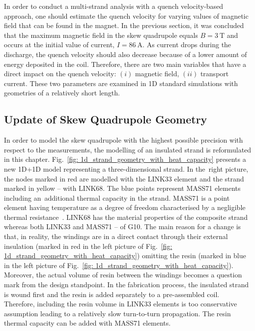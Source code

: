 
In order to conduct a multi-strand analysis with a quench velocity-based approach, one should estimate the quench velocity for varying values of magnetic field that can be found in the magnet. In the previous section, it was concluded that the maximum magnetic field in the skew quadrupole equals $B=3~\text{T}$ and occurs at the initial value of current, $I=86~\text{A}$. As current drops during the discharge, the quench velocity should also decrease because of a lower amount of energy deposited in the coil. Therefore, there are two main variables that have a direct impact on the quench velocity: $(i)$ magnetic field, $(ii)$ transport current. These two parameters are examined in 1D standard simulations with geometries of a relatively short length. 

\subsection{Update of Skew Quadrupole Geometry}
\label{subsection:update_skew_quadrupole_geometry}

In order to model the skew quadrupole with the highest possible precision with respect to the measurements, the modelling of an insulated strand is reformulated in this chapter. Fig.~\ref{fig: 1d_strand_geometry_with_heat_capacity} presents a new 1D+1D model representing a three-dimensional strand. In the~right picture, the nodes marked in red are modelled with the LINK33 element and the strand marked in yellow -- with LINK68. The blue points represent MASS71 elements including an~additional thermal capacity in the strand. MASS71 is a point element having temperature as a degree of freedom characterised by a negligible thermal resistance~\cite{ansys_element_manual}. LINK68 has the material properties of the composite strand whereas both LINK33 and MASS71 -- of G10. The main reason for a change is that, in reality, the windings are in a direct contact through their external insulation (marked in red in the left picture of Fig.~\ref{fig: 1d_strand_geometry_with_heat_capacity}) omitting the resin (marked in blue in the left picture of Fig.~\ref{fig: 1d_strand_geometry_with_heat_capacity}). Moreover, the actual volume of resin between the windings becomes a question mark from the design standpoint. In the fabrication process, the insulated strand is wound first and the resin is added separately to a pre-assembled coil. Therefore, including the resin volume in LINK33 elements is too conservative assumption leading to a relatively slow turn-to-turn propagation. The resin thermal capacity can be added with MASS71 elements.

